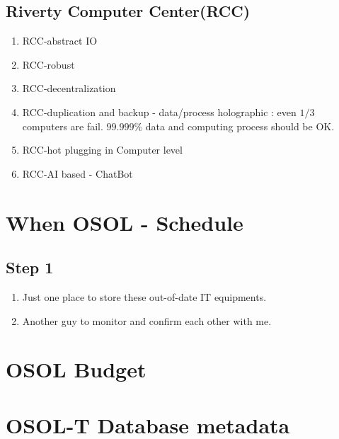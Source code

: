 \documentclass[a4paper,11pt]{article}
\begin{document}
\subsection{Riverty Computer Center(RCC)}
\begin{enumerate}
	\item RCC-abstract IO
	\item RCC-robust
	\item RCC-decentralization
	\item RCC-duplication and backup - data/process holographic : even $1/3$ computers are fail. $99.999\%$ data and computing process should be OK.
	\item RCC-hot plugging in Computer level
	\item RCC-AI based - ChatBot
\end{enumerate}


\section{When OSOL - Schedule}
\subsection{Step 1}
\begin{enumerate}
\item Just one place to store these out-of-date IT equipments.
\item Another guy to monitor and confirm each other with me.
\end{enumerate}

\section{OSOL Budget }

\appendix
\section{OSOL-T Database metadata}
\end{document}
